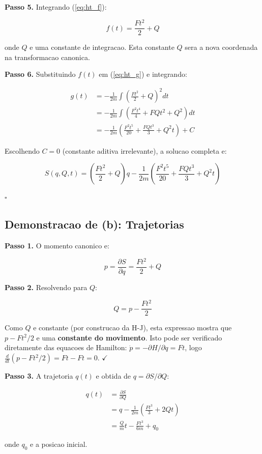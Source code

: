 \documentclass[12pt,a4paper,oneside]{article}
\begin{document}
\textbf{Passo 5.} Integrando (\ref{eq:ht_f}):

$$f(t) = \frac{Ft^2}{2} + Q$$

onde $Q$ e uma constante de integracao. Esta constante $Q$ sera a nova
coordenada na transformacao canonica.

\textbf{Passo 6.} Substituindo $f(t)$ em (\ref{eq:ht_g}) e integrando:

\begin{align*}
g(t) &= -\frac{1}{2m}\int \left(\frac{Ft^2}{2} + Q\right)^2 dt \\
&= -\frac{1}{2m}\int \left(\frac{F^2t^4}{4} + FQt^2 + Q^2\right) dt \\
&= -\frac{1}{2m}\left(\frac{F^2t^5}{20} + \frac{FQt^3}{3} + Q^2t\right) + C
\end{align*}

Escolhendo $C = 0$ (constante aditiva irrelevante), a solucao completa e:

$$\boxed{S(q, Q, t) = \left(\frac{Ft^2}{2} + Q\right)q -
\frac{1}{2m}\left(\frac{F^2t^5}{20} + \frac{FQt^3}{3} + Q^2t\right)}$$

$\square$

\subsection*{Demonstracao de (b): Trajetorias}

\textbf{Passo 1.} O momento canonico e:

$$p = \frac{\partial S}{\partial q} = \frac{Ft^2}{2} + Q$$

\textbf{Passo 2.} Resolvendo para $Q$:

$$Q = p - \frac{Ft^2}{2}$$

Como $Q$ e constante (por construcao da H-J), esta expressao mostra que
$p - Ft^2/2$ e uma \textbf{constante do movimento}. Isto pode ser verificado
diretamente das equacoes de Hamilton: $\dot p = -\partial H/\partial q = Ft$,
logo $\frac{d}{dt}(p - Ft^2/2) = Ft - Ft = 0$. $\checkmark$

\textbf{Passo 3.} A trajetoria $q(t)$ e obtida de $q = \partial S/\partial Q$:

\begin{align*}
q(t) &= \frac{\partial S}{\partial Q} \\
&= q - \frac{1}{2m}\left(\frac{Ft^3}{3} + 2Qt\right) \\
&= \frac{Q}{m}t - \frac{Ft^3}{6m} + q_0
\end{align*}

onde $q_0$ e a posicao inicial.
\end{document}
